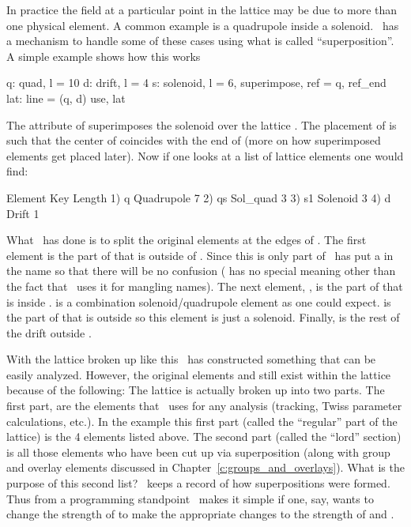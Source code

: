 In practice the field at a particular point in the lattice may be due
to more than one physical element. A common example is a quadrupole
inside a solenoid. \bmad\ has a mechanism to handle some of these
cases using what is called ``superposition''. A simple example shows
how this works
\begin{example}
  q: quad, l = 10
  d: drift, l = 4
  s: solenoid, l = 6, superimpose, ref = q, ref_end
  lat: line = (q, d)
  use, lat
\end{example}
The  attribute of  superimposes the 
solenoid over the lattice . The placement of  is such
that the center of  coincides with the end of  (more on
how superimposed elements get placed later). Now if one looks at a
list of lattice elements one would find:
\begin{example}
        Element   Key         Length
  1)    q{\B}        Quadrupole  7
  2)    q{\B}s       Sol_quad    3
  3)    s{\B}1       Solenoid    3
  4)    d{\B}        Drift       1
\end{example}
What \bmad\ has done is to split the original elements  at
the edges of .  The first element  is the part of 
that is outside of . Since this is only part of  \bmad\
has put a \vn{\B} in the name so that there will be no confusion
(\vn{\B} has no special meaning other than the fact that \bmad\ uses
it for mangling names). The next element, , is the part of
\vn{q} that is inside . \vn{q{\B}s} is a combination
solenoid/quadrupole element as one could expect.  is the part
of \vn{s} that is outside \vn{q} so this element is just a
solenoid. Finally,  is the rest of the drift outside .

With the lattice broken up like this \bmad\ has constructed something
that can be easily analyzed. However, the original elements \vn{q} and
\vn{s} still exist within the lattice because of the following: The
lattice is actually broken up into two parts. The first part, are the
elements that \bmad\ uses for any analysis (tracking, Twiss parameter
calculations, etc.).  In the example this first part (called the
``regular'' part of the lattice) is the 4 elements listed above. The
second part (called the ``lord'' section) is all those elements who
have been cut up via superposition (along with group and overlay
elements discussed in Chapter~\ref{c:groups_and_overlays}). What is
the purpose of this second list? \bmad\ keeps a record of how
superpositions were formed. Thus from a programming standpoint \bmad\
makes it simple if one, say, wants to change the  strength of
\vn{q} to make the appropriate changes to the \vn{k1} strength of
\vn{q\B} and \vn{q{\B}s}.

